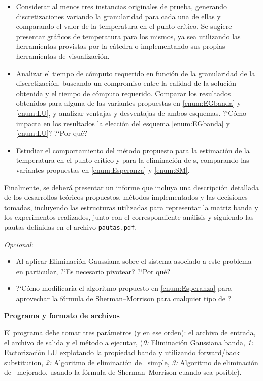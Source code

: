 \begin{itemize}
\item Considerar al menos tres instancias originales de prueba, generando discretizaciones variando la granularidad para cada una de ellas y comparando el valor de la temperatura en el punto cr\'itico. Se sugiere presentar gr\'aficos de temperatura para los mismos, ya sea utilizando las herramientas provistas por la c\'atedra o implementando sus propias herramientas de visualizaci\'on.
\item Analizar el tiempo de c\'omputo requerido en funci\'on de la granularidad de la discretizaci\'on, buscando un compromiso entre la calidad de la soluci\'on obtenida y el tiempo de c\'omputo requerido. Comparar los resultados obtenidos para alguna de las variantes propuestas en \ref{enum:EGbanda} y \ref{enum:LU}, y analizar ventajas y desventajas de ambos esquemas. ?`Cómo impacta en los resultados la elección del esquema \ref{enum:EGbanda} y \ref{enum:LU}? ?`Por qué?
\item Estudiar el comportamiento del m\'etodo propuesto para la estimaci\'on de la temperatura en el punto cr\'itico y para la eliminaci\'on de \atacante s, comparando las variantes propuestas en \ref{enum:Esperanza} y \ref{enum:SM}.
\end{itemize}

Finalmente, se deber\'a presentar un informe que incluya una descripci\'on detallada de los desarrollos teóricos propuestos, m\'etodos implementados y las decisiones tomadas, incluyendo las estructuras utilizadas para representar la matriz banda  y los experimentos realizados, junto con el correspondiente an\'alisis y siguiendo las pautas definidas en el archivo \verb+pautas.pdf+.

\textit{Opcional}:
\vspace*{-0.3cm}
\begin{itemize}
	\item Al aplicar Eliminación Gaussiana sobre el sistema asociado a este problema en particular, ?`Es necesario pivotear? ?`Por qu\'e?
	\item ?`Cómo modificaría el algoritmo propuesto en \ref{enum:Esperanza} para aprovechar la fórmula de Sherman–Morrison \cite{ShermanMorrison} para cualquier tipo de \atacante ?
\end{itemize}

{\noindent \bf Programa y formato de archivos}

El programa debe tomar tres par\'ametros (y en ese orden): el archivo de entrada, el archivo de salida y el m\'etodo a ejecutar, (\emph{0:} Eliminación Gaussiana banda, \emph{1:} Factorización LU explotando la propiedad banda y utilizando forward/back substitution, \emph{2:} Algoritmo de eliminación de \atacante\ simple, \emph{3:} Algoritmo de eliminación de \atacante\ mejorado, usando la fórmula de Sherman–Morrison cuando sea posible).

